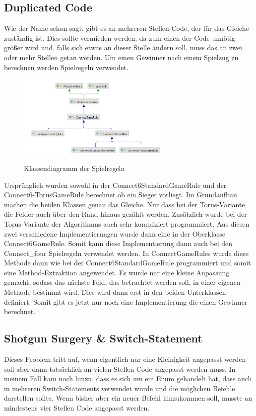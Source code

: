 \documentclass[12pt]{article}
\begin{document}
\subsection{Duplicated Code}
Wie der Name schon sagt, gibt es an mehreren Stellen Code, der für das Gleiche zuständig ist. Dies sollte vermieden werden, da zum einen der Code unnötig größer wird und, falls sich etwas an dieser Stelle ändern soll, muss das an zwei oder mehr Stellen getan werden. Um einen Gewinner nach einem Spielzug zu berechnen werden Spielregeln verwendet.

\begin{figure}[H]
\centering
{\includegraphics[height=4cm]{Bilder/ClassDiagGameRules}}
\caption{Klassendiagramm der Spielregeln}
\label{fig:ClassDiagGameRules}
\end{figure}

Ursprünglich wurden sowohl in der Connect6StandardGameRule und der Connect6-TorusGameRule berechnet ob ein Sieger vorliegt. Im Grundaufbau machen die beiden Klassen genau das Gleiche. Nur dass bei der Torus-Variante die Felder auch über den Rand hinaus gezählt werden. Zusätzlich wurde bei der Torus-Variante der Algorithmus auch sehr kompliziert programmiert. Aus diesen zwei verschiedene Implementierungen wurde dann eine in der Oberklasse Connect6GameRule. Somit kann diese Implementierung dann auch bei den Connect\_four Spielregeln verwendet werden. In ConnectGameRules wurde diese Methode dann wie bei der Connect6StandardGameRule programmiert und somit eine Method-Extraktion angewendet. Es wurde nur eine kleine Anpassung gemacht, sodass das nächste Feld, das betrachtet werden soll, in einer eigenen Methode bestimmt wird. Dies wird dann erst in den beiden Unterklassen definiert. Somit gibt es jetzt nur noch eine Implementierung die einen Gewinner berechnet.



\subsection{Shotgun Surgery \& Switch-Statement}
Dieses Problem tritt auf, wenn eigentlich nur eine Kleinigkeit angepasst werden soll aber dann tatsächlich an vielen Stellen Code angepasst werden muss. In meinem Fall kam noch hinzu, dass es sich um ein Enum gehandelt hat, dass auch in mehreren Switch-Statements verwendet wurde und die möglichen Befehle darstellen sollte. Wenn bisher aber ein neuer Befehl hinzukommen soll, musste an mindestens vier Stellen Code angepasst werden.
\\
\end{document}
